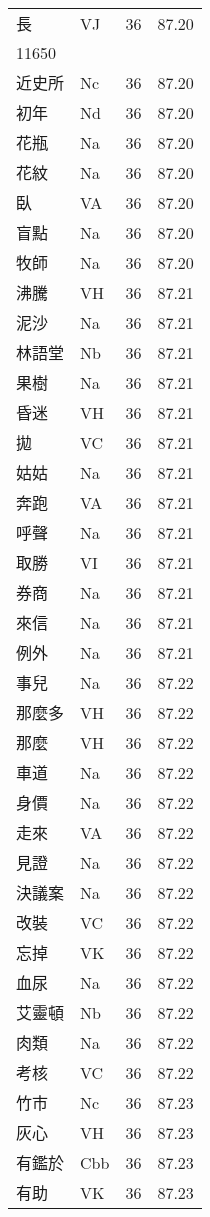 \documentclass[twocolumn]{book}
\begin{document}
\begin{supertabular}{llrr}
長 & VJ & 36 &  87.20\\
11650\\
近史所 & Nc & 36 &  87.20\\
初年 & Nd & 36 &  87.20\\
花瓶 & Na & 36 &  87.20\\
花紋 & Na & 36 &  87.20\\
臥 & VA & 36 &  87.20\\
盲點 & Na & 36 &  87.20\\
牧師 & Na & 36 &  87.20\\
沸騰 & VH & 36 &  87.21\\
泥沙 & Na & 36 &  87.21\\
林語堂 & Nb & 36 &  87.21\\
果樹 & Na & 36 &  87.21\\
昏迷 & VH & 36 &  87.21\\
拋 & VC & 36 &  87.21\\
姑姑 & Na & 36 &  87.21\\
奔跑 & VA & 36 &  87.21\\
呼聲 & Na & 36 &  87.21\\
取勝 & VI & 36 &  87.21\\
券商 & Na & 36 &  87.21\\
來信 & Na & 36 &  87.21\\
例外 & Na & 36 &  87.21\\
事兒 & Na & 36 &  87.22\\
那麼多 & VH & 36 &  87.22\\
那麼 & VH & 36 &  87.22\\
車道 & Na & 36 &  87.22\\
身價 & Na & 36 &  87.22\\
走來 & VA & 36 &  87.22\\
見證 & Na & 36 &  87.22\\
決議案 & Na & 36 &  87.22\\
改裝 & VC & 36 &  87.22\\
忘掉 & VK & 36 &  87.22\\
血尿 & Na & 36 &  87.22\\
艾靈頓 & Nb & 36 &  87.22\\
肉類 & Na & 36 &  87.22\\
考核 & VC & 36 &  87.22\\
竹市 & Nc & 36 &  87.23\\
灰心 & VH & 36 &  87.23\\
有鑑於 & Cbb & 36 &  87.23\\
有助 & VK & 36 &  87.23\\

\end{supertabular}
\end{document}
